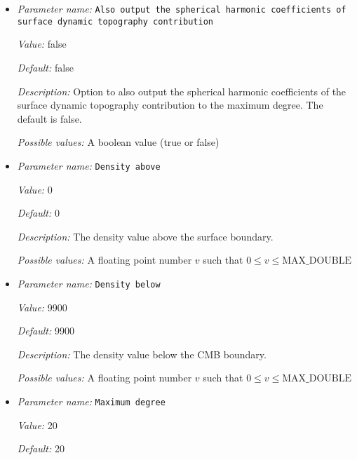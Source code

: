 \begin{itemize}
{\it Possible values:} A boolean value (true or false)
\item {\it Parameter name:} {\tt Also output the spherical harmonic coefficients of surface dynamic topography contribution}
\label{parameters:Postprocess/Geoid/Also output the spherical harmonic coefficients of surface dynamic topography contribution}


{\it Value:} false


{\it Default:} false


{\it Description:} Option to also output the spherical harmonic coefficients of the surface dynamic topography contribution to the maximum degree. The default is false. 


{\it Possible values:} A boolean value (true or false)
\item {\it Parameter name:} {\tt Density above}
\label{parameters:Postprocess/Geoid/Density above}


{\it Value:} 0


{\it Default:} 0


{\it Description:} The density value above the surface boundary.


{\it Possible values:} A floating point number $v$ such that $0 \leq v \leq \text{MAX\_DOUBLE}$
\item {\it Parameter name:} {\tt Density below}
\label{parameters:Postprocess/Geoid/Density below}


{\it Value:} 9900


{\it Default:} 9900


{\it Description:} The density value below the CMB boundary.


{\it Possible values:} A floating point number $v$ such that $0 \leq v \leq \text{MAX\_DOUBLE}$
\item {\it Parameter name:} {\tt Maximum degree}
\label{parameters:Postprocess/Geoid/Maximum degree}


{\it Value:} 20


{\it Default:} 20



\end{itemize}
